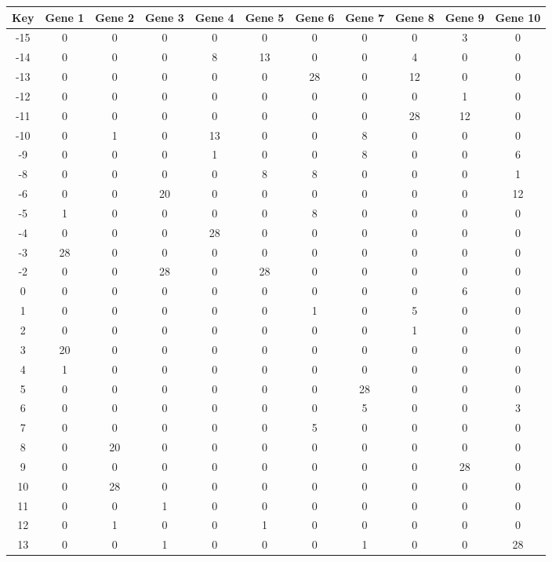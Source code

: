 \begin{tabular}{|c|c|c|c|c|c|c|c|c|c|c|}
\hline
Key & Gene 1 & Gene 2 & Gene 3 & Gene 4 & Gene 5 & Gene 6 & Gene 7 & Gene 8 & Gene 9 & Gene 10 \\
\hline
-15 & 0 & 0 & 0 & 0 & 0 & 0 & 0 & 0 & 3 & 0 \\
-14 & 0 & 0 & 0 & 8 & 13 & 0 & 0 & 4 & 0 & 0 \\
-13 & 0 & 0 & 0 & 0 & 0 & 28 & 0 & 12 & 0 & 0 \\
-12 & 0 & 0 & 0 & 0 & 0 & 0 & 0 & 0 & 1 & 0 \\
-11 & 0 & 0 & 0 & 0 & 0 & 0 & 0 & 28 & 12 & 0 \\
-10 & 0 & 1 & 0 & 13 & 0 & 0 & 8 & 0 & 0 & 0 \\
-9 & 0 & 0 & 0 & 1 & 0 & 0 & 8 & 0 & 0 & 6 \\
-8 & 0 & 0 & 0 & 0 & 8 & 8 & 0 & 0 & 0 & 1 \\
-6 & 0 & 0 & 20 & 0 & 0 & 0 & 0 & 0 & 0 & 12 \\
-5 & 1 & 0 & 0 & 0 & 0 & 8 & 0 & 0 & 0 & 0 \\
-4 & 0 & 0 & 0 & 28 & 0 & 0 & 0 & 0 & 0 & 0 \\
-3 & 28 & 0 & 0 & 0 & 0 & 0 & 0 & 0 & 0 & 0 \\
-2 & 0 & 0 & 28 & 0 & 28 & 0 & 0 & 0 & 0 & 0 \\
0 & 0 & 0 & 0 & 0 & 0 & 0 & 0 & 0 & 6 & 0 \\
1 & 0 & 0 & 0 & 0 & 0 & 1 & 0 & 5 & 0 & 0 \\
2 & 0 & 0 & 0 & 0 & 0 & 0 & 0 & 1 & 0 & 0 \\
3 & 20 & 0 & 0 & 0 & 0 & 0 & 0 & 0 & 0 & 0 \\
4 & 1 & 0 & 0 & 0 & 0 & 0 & 0 & 0 & 0 & 0 \\
5 & 0 & 0 & 0 & 0 & 0 & 0 & 28 & 0 & 0 & 0 \\
6 & 0 & 0 & 0 & 0 & 0 & 0 & 5 & 0 & 0 & 3 \\
7 & 0 & 0 & 0 & 0 & 0 & 5 & 0 & 0 & 0 & 0 \\
8 & 0 & 20 & 0 & 0 & 0 & 0 & 0 & 0 & 0 & 0 \\
9 & 0 & 0 & 0 & 0 & 0 & 0 & 0 & 0 & 28 & 0 \\
10 & 0 & 28 & 0 & 0 & 0 & 0 & 0 & 0 & 0 & 0 \\
11 & 0 & 0 & 1 & 0 & 0 & 0 & 0 & 0 & 0 & 0 \\
12 & 0 & 1 & 0 & 0 & 1 & 0 & 0 & 0 & 0 & 0 \\
13 & 0 & 0 & 1 & 0 & 0 & 0 & 1 & 0 & 0 & 28 \\
\hline
\end{tabular}
